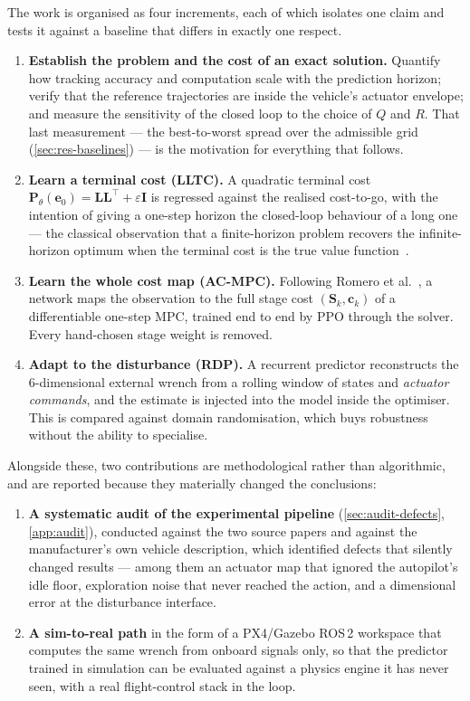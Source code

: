 \documentclass[11pt,a4paper,twoside,openright]{report}
\newcommand{\transp}{^{\!\top}}
\renewcommand{\vec}[1]{\bm{#1}}
\newcommand{\mat}[1]{\bm{#1}}
\newcommand{\err}{\vec{e}}
\DeclareRobustCommand{\ACMPC}{AC\nbd MPC}
\DeclareRobustCommand{\LLTC}{LLTC}
\DeclareRobustCommand{\RDP}{RDP}
\theoremstyle{plain}
\theoremstyle{definition}
\theoremstyle{remark}
\DeclareRobustCommand{\nbd}{\mbox{-}}
\begin{document}
	The work is organised as four increments, each of which isolates one claim and
	tests it against a baseline that differs in exactly one respect.

	\begin{enumerate}[leftmargin=*]
		\item \textbf{Establish the problem and the cost of an exact solution.}
		Quantify how tracking accuracy and computation scale with the prediction
		horizon; verify that the reference trajectories are inside the vehicle's
		actuator envelope; and measure the sensitivity of the closed loop to the
		choice of $Q$ and $R$. That last measurement --- the best-to-worst spread over
		the admissible grid (\cref{sec:res-baselines}) --- is the motivation for
		everything that follows.
		\item \textbf{Learn a terminal cost (\LLTC).} A quadratic terminal cost
		$\mat P_\theta(\err_0)=\mat L\mat L\transp+\varepsilon\mat I$ is regressed
		against the realised cost-to-go, with the intention of giving a one-step
		horizon the closed-loop behaviour of a long one --- the classical
		observation that a finite-horizon problem recovers the infinite-horizon
		optimum when the terminal cost is the true value
		function~\cite{lowrey2019polo,bhardwaj2021blending}.
		\item \textbf{Learn the whole cost map (\ACMPC).} Following Romero et
		al.~\cite{romero2024acmpc}, a network maps the observation to the full
		stage cost $(\mat S_k,\vec c_k)$ of a differentiable one-step MPC, trained
		end to end by PPO through the solver. Every hand-chosen stage weight is
		removed.
		\item \textbf{Adapt to the disturbance (\RDP).} A recurrent predictor
		reconstructs the \num{6}-dimensional external wrench from a rolling window
		of states and \emph{actuator commands}, and the estimate is injected into
		the model inside the optimiser. This is compared against domain
		randomisation, which buys robustness without the ability to specialise.
	\end{enumerate}

	Alongside these, two contributions are methodological rather than algorithmic,
	and are reported because they materially changed the conclusions:

	\begin{enumerate}[leftmargin=*,resume]
		\item \textbf{A systematic audit of the experimental pipeline}
		(\cref{sec:audit-defects}, \cref{app:audit}), conducted against the two
		source papers and against the manufacturer's own vehicle description, which
		identified defects that silently changed results --- among them an actuator
		map that ignored the autopilot's idle floor, exploration noise that never
		reached the action, and a dimensional error at the disturbance interface.
		\item \textbf{A sim-to-real path} in the form of a PX4/Gazebo ROS\,2 workspace
		that computes the same wrench from onboard signals only, so that the
		predictor trained in simulation can be evaluated against a physics engine
		it has never seen, with a real flight-control stack in the loop.
	\end{enumerate}
\end{document}
